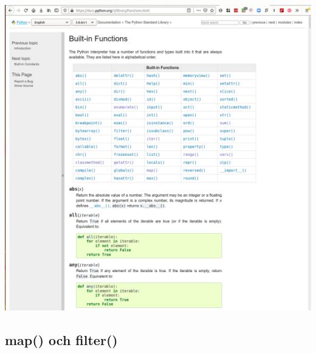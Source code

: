 \begin{frame}
  \includegraphics[width=\columnwidth]{figs/docs-built-in.png}
\end{frame}

\subsection{map() och filter()}

\begin{frame}[fragile]
  \begin{example}
    
  \end{example}
\end{frame}

\begin{frame}[fragile]
  \begin{example}
    
  \end{example}
\end{frame}

\begin{frame}[fragile]
  \begin{example}
    
  \end{example}
\end{frame}

